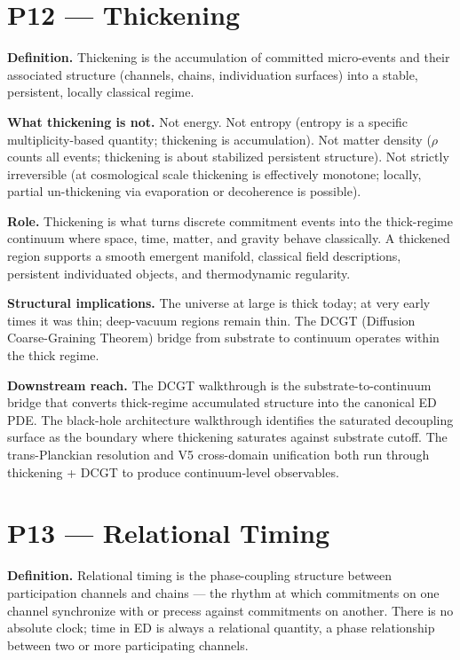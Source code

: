 \documentclass[11pt,a4paper]{article}
\begin{document}
\section{P12 --- Thickening}

\textbf{Definition.} Thickening is the accumulation of committed micro-events and their associated structure (channels, chains, individuation surfaces) into a stable, persistent, locally classical regime.

\textbf{What thickening is not.} Not energy. Not entropy (entropy is a specific multiplicity-based quantity; thickening is accumulation). Not matter density ($\rho$ counts all events; thickening is about stabilized persistent structure). Not strictly irreversible (at cosmological scale thickening is effectively monotone; locally, partial un-thickening via evaporation or decoherence is possible).

\textbf{Role.} Thickening is what turns discrete commitment events into the thick-regime continuum where space, time, matter, and gravity behave classically. A thickened region supports a smooth emergent manifold, classical field descriptions, persistent individuated objects, and thermodynamic regularity.

\textbf{Structural implications.} The universe at large is thick today; at very early times it was thin; deep-vacuum regions remain thin. The DCGT (Diffusion Coarse-Graining Theorem) bridge from substrate to continuum operates within the thick regime.

\textbf{Downstream reach.} The DCGT walkthrough is the substrate-to-continuum bridge that converts thick-regime accumulated structure into the canonical ED PDE. The black-hole architecture walkthrough identifies the saturated decoupling surface as the boundary where thickening saturates against substrate cutoff. The trans-Planckian resolution and V5 cross-domain unification both run through thickening + DCGT to produce continuum-level observables.

\section{P13 --- Relational Timing}

\textbf{Definition.} Relational timing is the phase-coupling structure between participation channels and chains --- the rhythm at which commitments on one channel synchronize with or precess against commitments on another. There is no absolute clock; time in ED is always a relational quantity, a phase relationship between two or more participating channels.
\end{document}
